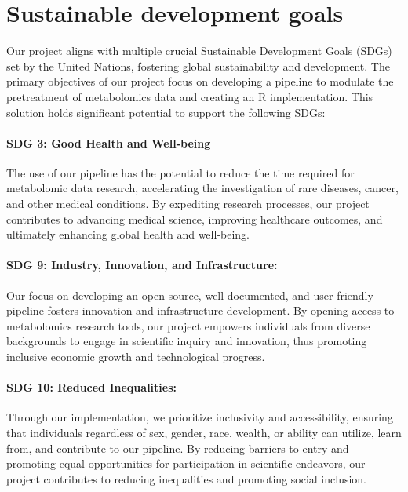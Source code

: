 \documentclass[ENG, BIB]{TFUOC}%
\begin{document}
\chapter{Sustainable development goals}
\label{s:etic}

 Our project aligns with multiple crucial Sustainable Development Goals (SDGs) set by the United Nations, fostering global sustainability and development. The primary objectives of our project focus on developing a pipeline to modulate the pretreatment of metabolomics data and creating an R implementation. This solution holds significant potential to support the following SDGs:  
 
\subsubsection{SDG 3: Good Health and Well-being} 
 
The use of our pipeline has the potential to reduce the time required for metabolomic data research, accelerating the investigation of rare diseases, cancer, and other medical conditions. By expediting research processes, our project contributes to advancing medical science, improving healthcare outcomes, and ultimately enhancing global health and well-being.
 
\subsubsection{SDG 9: Industry, Innovation, and Infrastructure:} 
 
Our focus on developing an open-source, well-documented, and user-friendly pipeline fosters innovation and infrastructure development. By opening access to metabolomics research tools, our project empowers individuals from diverse backgrounds to engage in scientific inquiry and innovation, thus promoting inclusive economic growth and technological progress.
 
\subsubsection{SDG 10: Reduced Inequalities:} 

Through our implementation, we prioritize inclusivity and accessibility, ensuring that individuals regardless of sex, gender, race, wealth, or ability can utilize, learn from, and contribute to our pipeline. By reducing barriers to entry and promoting equal opportunities for participation in scientific endeavors, our project contributes to reducing inequalities and promoting social inclusion. 
\end{document}
